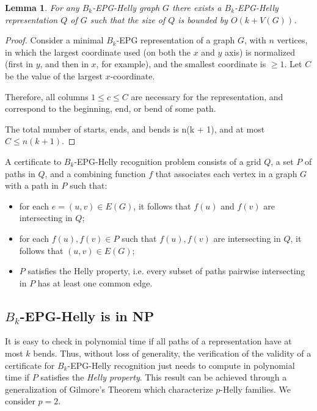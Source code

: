 \documentclass[a4paper,11pt]{article}
\newtheorem{lema}[theorem]{Lemma}
\begin{document}
\begin{lema}
For any $B_k$-EPG-Helly graph $G$ there exists  a $B_k$-EPG-Helly representation $Q$ of $G$ such that the size of $Q$ is bounded by $O(k+V(G))$.

\end{lema}

\begin{proof}
Consider a minimal $B_k$-EPG representation of a graph $G$, with $n$ vertices, in which the largest coordinate used (on both the $x$ and $y$ axis) is normalized (first in $y$, and then in $x$, for example), and the smallest coordinate is $\geq 1$. Let $C$ be the value of the largest $x$-coordinate.

 Therefore, all columns $1 \leq c \leq C$ are necessary for the representation, and correspond to the beginning, end, or bend of some path.

The total number of starts, ends, and bends is n(k + 1), and at most $C \leq n(k + 1)$.

\end{proof}


A certificate to {\sc $B_k$-EPG-Helly recognition} problem consists of a grid $Q$, a set $P$ of paths in $Q$, and a combining function $f$ that associates each vertex in a graph $G$ with a path  in $P$ such that:

\begin{itemize}
\item for each $e=(u,v) \in E(G)$, it follows that $f(u)$ and $f(v)$ are intersecting in $Q$;
\item for each $f(u),f(v) \in P$ such that $f(u),f(v)$ are intersecting in $Q$, it follows that $(u,v) \in E(G)$;
\item $P$ satisfies the Helly property, i.e. every subset of paths pairwise intersecting in $P$ has at least one common edge.
\end{itemize}

\subsection{$B_k$-EPG-Helly is in NP}

It is easy to check in polynomial time if all paths of a representation have at most $k$ bends. Thus, without loss of generality, the verification of the validity of a certificate for $B_k$-EPG-Helly recognition just needs to compute in polynomial time if $ P $ satisfies the  \textit{Helly property}. This result can be achieved through a generalization of Gilmore's Theorem \citep{bergeDuchet1975} which characterize $p$-Helly families. We consider $p=2$.
\end{document}
